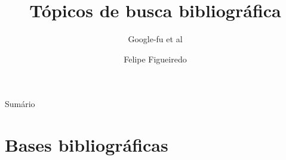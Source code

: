 \documentclass{beamer}
\title%
{Tópicos de busca bibliográfica}
\subtitle
{Google-fu et al} %
\author%
{Felipe Figueiredo}%
\institute[INTO] %
{Instituto Nacional de Traumatologia e Ortopedia
}
\date%
{}
\begin{document}
\begin{frame}
  \titlepage
\end{frame}

\begin{frame}{Sumário}
  \tableofcontents
\end{frame}








\section{Bases bibliográficas}
\end{document}
